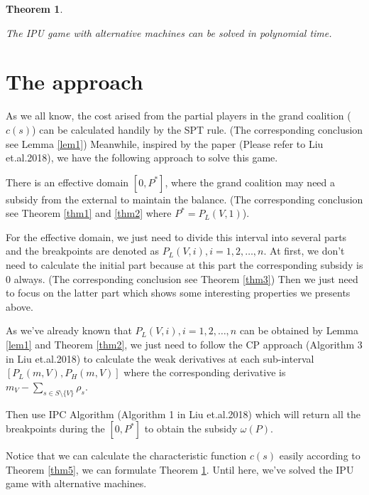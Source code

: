 \documentclass[UTF8]{article}
\newtheorem{thm}{\hspace{2em}Theorem}
\begin{document}
\begin{thm}\label{thm6}

The IPU game with alternative machines can be solved in polynomial time.

\end{thm}


\section{The approach}


As we all know, the cost arised from the partial players in the grand coalition ($c(s)$) can be calculated handily by the SPT rule. (The corresponding conclusion see Lemma \ref{lem1}) Meanwhile, inspired by the paper (Please refer to Liu et.al.2018), we have the following approach to solve this game.


There is an effective domain $[0, P^*]$, where the grand coalition may need a subsidy from the external to maintain the balance.
(The corresponding conclusion see Theorem \ref{thm1} and \ref{thm2} where $P^* = P_L(V,1)$).


For the effective domain, we just need to divide this interval into several parts and the breakpoints are denoted as $P_L(V,i), i = 1,2,\ldots,n$.  At first, we don't need to calculate the initial part because at this part the corresponding subsidy is 0 always. (The corresponding conclusion see Theorem \ref{thm3}) Then we just need to focus on the latter part which shows some interesting properties we presents above.


As we've already known that $P_L(V,i), i = 1,2,\ldots,n$ can be obtained by Lemma \ref{lem1} and Theorem \ref{thm2}, we just need to follow the CP approach (Algorithm 3 in Liu et.al.2018) to calculate the weak derivatives at each sub-interval $[P_L(m,V),P_H(m,V)]$ where the corresponding derivative is $m_V-\sum_{s\in S\setminus\{V\}} \rho_s$.

Then use IPC Algorithm (Algorithm 1 in Liu et.al.2018) which will return all the breakpoints during the $[0, P^*]$ to obtain the subsidy $\omega(P)$.

Notice that we can calculate the characteristic function $c(s)$ easily according to Theorem \ref{thm5}, we can formulate Theorem \ref{thm6}. Until here, we've solved the IPU game with alternative machines.
\end{document}

